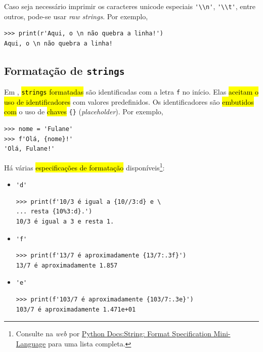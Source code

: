 \begin{obs}
  Caso seja necessário imprimir os caracteres unicode especiais \lstinline+'\\n'+, \lstinline+'\\t'+, entre outros, pode-se usar \textit{raw strings}. Por exemplo,

\begin{lstlisting}
>>> print(r'Aqui, o \n não quebra a linha!')
Aqui, o \n não quebra a linha!
\end{lstlisting}
\end{obs}

\subsection{Formatação de \texttt{strings}}\label{cap_lingua_sec_string:subsec:format}

Em {\python}, \hl{\texttt{strings} formatadas} são identificadas com a letra \lstinline+f+ no início. Elas \hl{aceitam o uso de identificadores} com valores predefinidos. Os identificadores são \hl{embutidos com} o uso de \hl{chaves} \lstinline+{}+ (\textit{placeholder}). Por exemplo,

\begin{lstlisting}
>>> nome = 'Fulane'
>>> f'Olá, {nome}!'
'Olá, Fulane!'
\end{lstlisting}

Há várias \hl{especificações de formatação} disponíveis\footnote{Consulte na \textit{web} por \href{https://docs.python.org/3/library/string.html\#format-specification-mini-language}{Python Docs:String: Format Specification Mini-Language} para uma lista completa.}:
\begin{itemize}
\item \lstinline+'d'+ 

\begin{lstlisting}[xrightmargin=2.5em]
>>> print(f'10/3 é igual a {10//3:d} e \
... resta {10%3:d}.')
10/3 é igual a 3 e resta 1.
\end{lstlisting}

\item \lstinline+'f'+ 

\begin{lstlisting}[xrightmargin=2.5em]
>>> print(f'13/7 é aproximadamente {13/7:.3f}')
13/7 é aproximadamente 1.857
\end{lstlisting}

\item \lstinline+'e'+ 

\begin{lstlisting}[xrightmargin=2.5em]
>>> print(f'103/7 é aproximadamente {103/7:.3e}')
103/7 é aproximadamente 1.471e+01
\end{lstlisting}  

\end{itemize}

